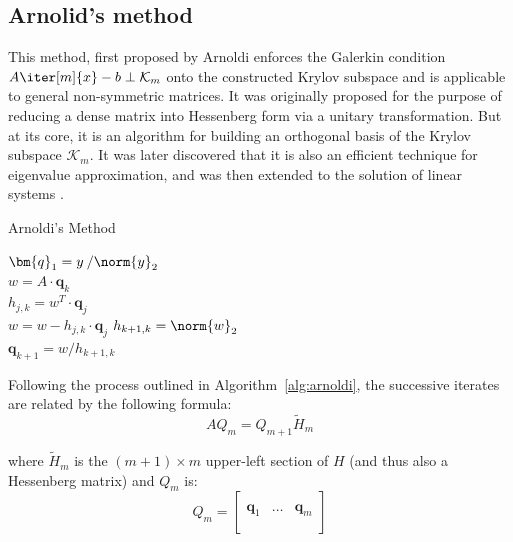 \subsection{Arnolid's method}
\label{sec:arnoldi}
This method, first proposed by Arnoldi \cite{arnoldi_principle_1951} enforces the Galerkin condition $A\iter[m]{x} -b \perp \mathcal{K}_m$ onto the constructed Krylov subspace and is applicable to general non-symmetric matrices. It was originally proposed for the purpose of reducing a dense matrix into Hessenberg form via a unitary transformation. But at its core, it is an algorithm for building an orthogonal basis of the Krylov subspace $\mathcal{K}_m$. It was later discovered that it is also an efficient technique for eigenvalue approximation, and was then extended to the solution of linear systems \cite{saad_iterative_2003}. 

\begin{algorithm}[h]
  \caption{Arnoldi's Method}
  \label{alg:arnoldi}
  \SetAlgoLined
  $\bm{q}_1= y\:/\norm{y}_2$ \\
   {
    $w =A\cdot \bm{q}_k$ \\
     {
      $h_{j,k} = w^T\cdot \bm{q}_j$ \\
      $ w = w - h_{j,k}\cdot \bm{q}_j$}
    $h_{k+1,k} = \norm{w}_2$ \\
    $\bm{q}_{k+1} = w/h_{k+1,k}$
  }
\end{algorithm}

\noindent Following the process outlined in Algorithm~\hyperref[alg:arnoldi]{\ref{alg:arnoldi}}, the successive iterates are related by the following formula:
\begin{equation}
\label{eqn:arnoldi}
AQ_m=Q_{m+1}\tilde{H}_m
\end{equation}

\noindent where $\tilde{H}_m$ is the $(m+1) \times m$ upper-left section of $H$ (and thus also a Hessenberg matrix) and $Q_m$ is:
\begin{equation}
  Q_m =
  \left[
    \begin{array}{c|c|c}
      & & \\
      \bm{q}_1 &\dots & \bm{q}_m \\
      & & \\
    \end{array}
  \right] 
\end{equation}

